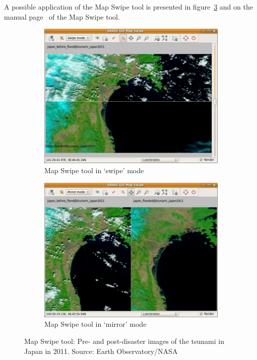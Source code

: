 \documentclass[a4paper,12pt,oneside]{book}
\newcommand{\ms}{Map Swipe\xspace}
\begin{document}
A possible application of the \ms tool is presented in figure~\ref{fig:mapswipe}
and on the manual page~\cite{grassUserMan} of the \ms tool.

\begin{figure}[ht!]
\centering
    \begin{subfigure}[ht]{0.75\textwidth}
    \centering
        \includegraphics[width=\textwidth]{./images/mapswipe_tsunami_swipe.jpeg}
    \caption{\ms tool in `swipe' mode}
    \label{fig:mapswipe_swipe}
    \end{subfigure}
    \begin{subfigure}[ht]{0.75\textwidth}
    \centering
        \includegraphics[width=\textwidth]{./images/mapswipe_tsunami_mirror.jpeg}
    \caption{\ms tool in `mirror' mode}
    \label{fig:mapswipe_mirror}
    \end{subfigure}
\caption[\ms tool: Pre- and post-disaster images of the tsunami in Japan in 2011]
        {\ms tool: Pre- and post-disaster images of the tsunami in Japan in 2011.
        Source: Earth Observatory/NASA}
\label{fig:mapswipe}
\end{figure}
\end{document}
